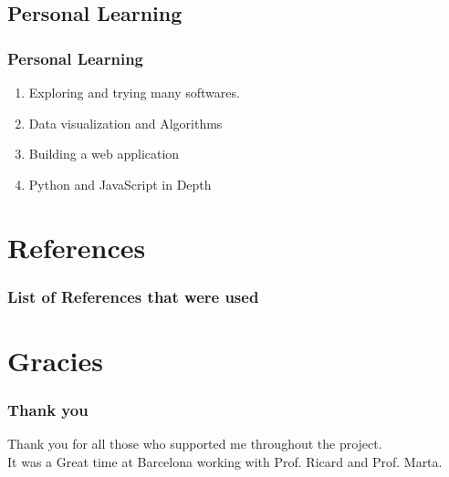 \documentclass{beamer}
\begin{document}
\subsection{Personal Learning}
\frame
{
	\frametitle{Personal Learning}
\begin{enumerate}
\item Exploring and trying many softwares.
\item Data visualization and Algorithms
\item Building a web application
\item Python and JavaScript in Depth
\end{enumerate}
}




\section{References}

\frame
{
	\frametitle{List of References that were used}


{}
}

\section{Gracies}
\frame
{
	\frametitle{Thank you}
Thank you for all those who supported me throughout the project.\\
It was a Great time at Barcelona working with Prof. Ricard and Prof. Marta.

}
\end{document}
